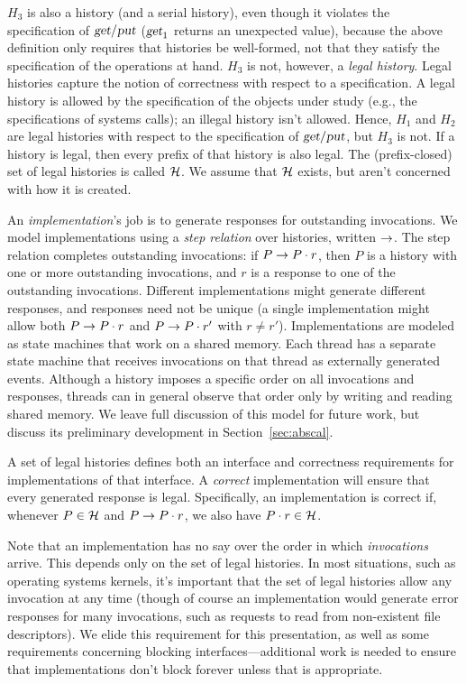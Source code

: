 $H_3$ is also a history (and a serial history), even though it violates
the specification of $\textsl{get}\slash\textsl{put}$ ($\textsl{get}_1$ returns an
unexpected value), because the above definition only requires that
histories be well-formed, not that they satisfy the specification of the
operations at hand.  $H_3$ is not, however, a \emph{legal history}.
Legal histories capture the notion of correctness with respect to
a specification.  A legal history is allowed by the
specification of the objects under study (e.g., the specifications
of systems calls); an illegal history isn't
allowed.  Hence, $H_1$ and $H_2$ are legal histories with respect to the
specification of $\textsl{get}\slash\textsl{put}$, but $H_3$ is not.
If a history is legal, then every prefix of that history is
also legal. The (prefix-closed) set of legal histories is called
$\mathcal{H}$.
We assume that $\mathcal{H}$ exists, but aren't
concerned with how it is created.

An \emph{implementation}'s job is to generate responses for outstanding
invocations.
%
We model implementations using a \emph{step relation} over histories,
written $\rightarrow$.
%
The step relation completes outstanding invocations: if $P \rightarrow P\cdot
r$, then $P$ is a history with one or more outstanding invocations, and
$r$ is a response to one of the outstanding invocations.
%
Different implementations might generate different responses, and
responses need not be unique (a single implementation might allow both
$P \rightarrow P\cdot r$ and $P \rightarrow P\cdot r'$ with $r \neq r'$).
%
Implementations are modeled as state machines that work on a shared
memory.
%
Each thread has a separate state machine that receives invocations on
that thread as externally generated events.
%
Although a history imposes a specific order on all invocations and
responses, threads can in general observe that order only by
writing and reading shared memory.
%
We leave full discussion of this model for future work, but
discuss its preliminary development in Section~\ref{sec:abscal}.

A set of legal histories defines both an interface and correctness
requirements for implementations of that interface.
%
A \emph{correct} implementation will ensure that every generated response is
legal.
%
Specifically, an implementation is correct if, whenever $P \in
\mathcal{H}$ and  $P \rightarrow P\cdot r$, we also have $P\cdot r \in
\mathcal{H}$.

Note that an implementation has no say over the order in which
\emph{invocations} arrive.
%
This depends only on the set of legal histories.
%
In most situations, such as operating systems kernels, it's important
that the set of legal histories allow any invocation at any time (though
of course an implementation would generate error responses for many
invocations, such as requests to read from non-existent file
descriptors).
%
We elide this requirement for this presentation, as well as some requirements concerning blocking
interfaces---additional work is needed to ensure that implementations
don't block forever unless that is appropriate.


